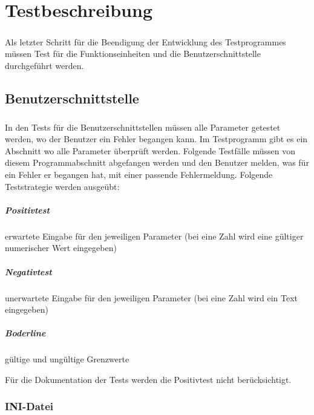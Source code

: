 \chapter{Testbeschreibung}\label{chp:Testbeschreibung}
\paragraph{}
Als letzter Schritt für die Beendigung der Entwicklung des Testprogrammes müssen Test für die Funktionseinheiten und die Benutzerschnittstelle durchgeführt werden. 


\section{Benutzerschnittstelle}
\paragraph{}
In den Tests für die Benutzerschnittstellen müssen alle Parameter getestet werden, wo der Benutzer ein Fehler begangen kann. Im Testprogramm gibt es ein Abschnitt wo alle Parameter überprüft werden. Folgende Testfälle müssen von diesem Programmabschnitt abgefangen werden und den Benutzer melden, was für ein Fehler er begangen hat, mit einer passende Fehlermeldung. Folgende Teststrategie werden ausgeübt:

\paragraph{Positivtest} erwartete Eingabe für den jeweiligen Parameter (bei eine Zahl wird eine gültiger numerischer Wert eingegeben)
\paragraph{Negativtest} unerwartete Eingabe für den jeweiligen Parameter (bei eine Zahl wird ein Text eingegeben)
\paragraph{Boderline} gültige und ungültige Grenzwerte

Für die Dokumentation der Tests werden die Positivtest nicht berücksichtigt. 


\subsection{INI-Datei}
